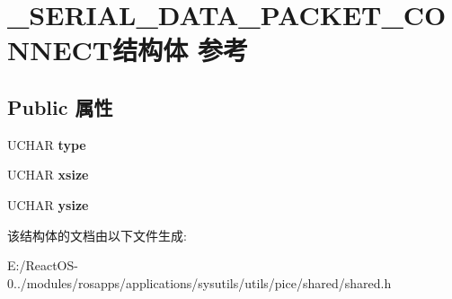 \hypertarget{struct___s_e_r_i_a_l___d_a_t_a___p_a_c_k_e_t___c_o_n_n_e_c_t}{}\section{\+\_\+\+S\+E\+R\+I\+A\+L\+\_\+\+D\+A\+T\+A\+\_\+\+P\+A\+C\+K\+E\+T\+\_\+\+C\+O\+N\+N\+E\+C\+T结构体 参考}
\label{struct___s_e_r_i_a_l___d_a_t_a___p_a_c_k_e_t___c_o_n_n_e_c_t}
\subsection*{Public 属性}
\begin{DoxyCompactItemize}
\item 
\mbox{\label{struct___s_e_r_i_a_l___d_a_t_a___p_a_c_k_e_t___c_o_n_n_e_c_t_a888c0707001eac41fd0b2c4ada9b63fe}} 
U\+C\+H\+AR {\bfseries type}
\item 
\mbox{\label{struct___s_e_r_i_a_l___d_a_t_a___p_a_c_k_e_t___c_o_n_n_e_c_t_a4a042edaff901456ce2c0bb64eb3742d}} 
U\+C\+H\+AR {\bfseries xsize}
\item 
\mbox{\label{struct___s_e_r_i_a_l___d_a_t_a___p_a_c_k_e_t___c_o_n_n_e_c_t_acb58ca680f23b962a077eb10aa6fc07c}} 
U\+C\+H\+AR {\bfseries ysize}
\end{DoxyCompactItemize}


该结构体的文档由以下文件生成\+:\begin{DoxyCompactItemize}
\item 
E\+:/\+React\+O\+S-\/0../modules/rosapps/applications/sysutils/utils/pice/shared/shared.\+h\end{DoxyCompactItemize}
